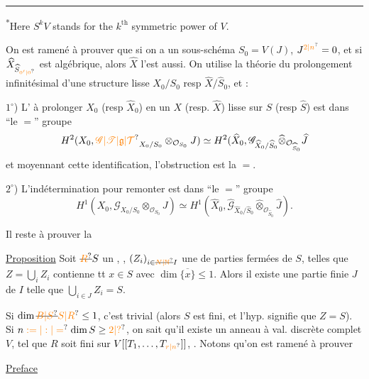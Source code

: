\noindent\rule{5em}{0.4pt}\par
\noindent\textsuperscript{*}Here $S^k V$ stands for the $k^{\mathrm{th}}$ symmetric power of $V$.

On est ramené à prouver que si  on a un sous-schéma $S_0=V(J)$, $J^{\unsure{2|n}}=0$, et si $\widehat X_{\widehat S_{\unsure{0'|0}}}$ est algébrique, alors $\widehat X$ l'est aussi. On utilise la théorie du prolongement infinitésimal d'une structure lisse $X_0/S_0$ resp $\widehat X/\widehat S_0$, et :

$1^\circ$) L' à prolonger $X_0$ (resp $\widehat X_0$) en un $X$ (resp. $\widehat X$) lisse sur $S$ (resp $\widehat S$) est dans ``le $=$'' groupe
\[
H^2(X_0,\unsure{\mathscr G|\mathscr T|\mathfrak g|\mathcal T}_{X_0/S_0}\otimes_{\mathcal O_{S_0}}J)\simeq H^2(\widehat X_0,\mathscr G_{\widehat X_0/\widehat S_0}\widehat\otimes_{\mathcal O_{\widehat S_0}}\widehat J
\]
et moyennant cette identification, l'obstruction est la $=$.

$2^\circ$) L'indétermination pour remonter est dans ``le $=$'' groupe
\[
H^1(X_0,\mathscr G_{X_0/S_0}\otimes_{\mathcal O_{S_0}}J)\simeq H^1(\widehat X_0,\widehat{\mathscr G}_{\widehat X_0/\widehat S_0}\widehat\otimes_{\mathcal O_{\widehat S_0}}\widehat J).
\]

Il reste à prouver la

\uline{Proposition} Soit $\deleted{\unsure{R}}S$ un  , , $(Z_i)_{i\in\deleted{\unsure{N|\mathbb N}}I}$ une   de parties fermées  de $S$, telles que $Z=\bigcup_i Z_i$ contienne tt $x\in S$ avec $\dim\overline{\{x\}}\leq1$. Alors il existe une partie finie $J$ de $I$ telle que $\bigcup_{i\in J} Z_i=S$.

 Si $\dim\deleted{\unsure{B|S}}\unsure{S|R}\leq1$, c'est trivial (alors  $S$ est fini, et l'hyp. signifie que $Z=S$). Si $n\mathrel{\unsure{:=|:|=}}\dim S\geq\unsure{2|?}$, on sait qu'il existe un anneau à val. discrète complet $V$,  tel que $R$ soit fini sur $V[[T_1,\ldots,T_{\unsure{r|n}}]]$, . Notons qu'on est ramené  à prouver

\begin{center}
\uline{Preface}
\end{center}

